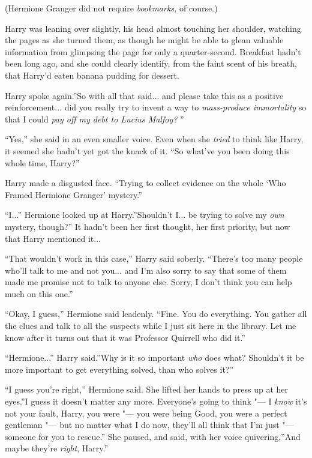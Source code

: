 (Hermione Granger did not require \emph{bookmarks,} of course.)

Harry was leaning over slightly, his head almost touching her shoulder,
watching the pages as she turned them, as though he might be able to
glean valuable information from glimpsing the page for only a
quarter-second. Breakfast hadn't been long ago, and she could clearly
identify, from the faint scent of his breath, that Harry'd eaten banana
pudding for dessert.

Harry spoke again.''So with all that said... and please take this
as a positive reinforcement... did you really try to invent a way
to \emph{mass-produce immortality} so that I could \emph{pay off my debt
to Lucius Malfoy?} ''

``Yes,'' she said in an even smaller voice. Even when she \emph{tried}
to think like Harry, it seemed she hadn't yet got the knack of it. ``So
what've you been doing this whole time, Harry?''

Harry made a disgusted face. ``Trying to collect evidence on the whole
`Who Framed Hermione Granger' mystery.''

``I...'' Hermione looked up at Harry.''Shouldn't I... be
trying to solve my \emph{own} mystery, though?'' It hadn't been her
first thought, her first priority, but now that Harry mentioned
it...

``That wouldn't work in this case,'' Harry said soberly. ``There's too
many people who'll talk to me and not you... and I'm also sorry to
say that some of them made me promise not to talk to anyone else. Sorry,
I don't think you can help much on this one.''

``Okay, I guess,'' Hermione said leadenly. ``Fine. You do everything.
You gather all the clues and talk to all the suspects while I just sit
here in the library. Let me know after it turns out that it was
Professor Quirrell who did it.''

``Hermione...'' Harry said.''Why is it so important \emph{who} does
what? Shouldn't it be more important to get everything solved, than who
solves it?''

``I guess you're right,'' Hermione said. She lifted her hands to press
up at her eyes.''I guess it doesn't matter any more. Everyone's going to
think "--- I \emph{know} it's not your fault, Harry, you were "--- you were
being Good, you were a perfect gentleman "--- but no matter what I do now,
they'll all think that I'm just "--- someone for you to rescue.'' She
paused, and said, with her voice quivering,''And maybe they're
\emph{right}, Harry.''

